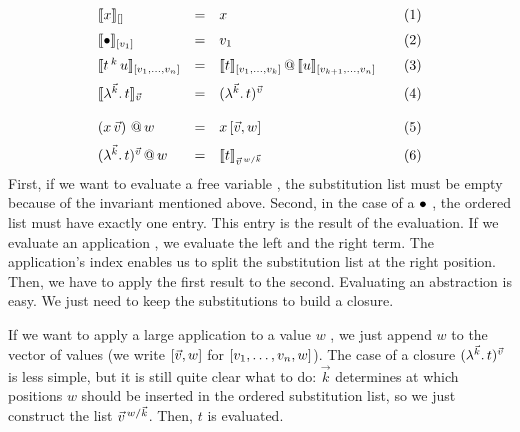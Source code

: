 \documentclass[submission,copyright,creativecommons]{eptcs}
\begin{document}
\[ 
\begin{array}{lcl@{\qquad} r}
 \ev x {\emptyVec} & = & x & \lab 1 \\ \noalign{\medskip}
 \ev \ovar {\ve{v_1}} & = & v_1 & \lab 2\\  \noalign{\medskip}
 \ev {t \oapp k u} {\ve{v_1, \ldots, v_n}} & = & {\ev t {\ve{v_1, \ldots, v_k}}} \ap {\ev u {\ve{v_{k+1}, \ldots, v_n}}}  & \lab 3 \\  \noalign{\medskip}
 \ev {\LaO {\vec k} t}  {\vec v} & = & \Val {\vec k} t {\vec v} & \lab 4 \\  
\\ 
 \pa{x \sspace \vec v} \ap w & = & x \sspace \ve{\vec v, w}  & \lab 5
\\ \noalign{\medskip}
 \Val{\vec k} t {\vec v}   \ap w & = & \ev t {\multiinsert{\vec v}{\vec k}{w}} & \lab 6
\end{array}
\]
First, if we want to evaluate a free variable , the substitution list must be empty because of the invariant mentioned above. 
Second, in the case of a $\ovar$ , the ordered list must have exactly one entry. This entry is the result of the evaluation. 
If we evaluate an application , we evaluate the left and the right term. The application's index enables us to split the substitution list at the right position. Then, we have to apply the first result to the second. 
Evaluating an abstraction  is easy. We just need to keep the substitutions to build a closure. 

If we want to apply a large application to a value $w$  , we just append $w$ to the vector of values (we write $\ve{\vec v, w}$ for $\ve{v_1, \ldots, v_n, w}$). 
The case of a closure $\Val {\vec k} t {\vec v}$  is less simple, but it is still quite clear what to do: $\vec k$ determines at which positions $w$ should be inserted in the ordered substitution list, so we just construct the list $\multiinsert {\vec v} {\vec k} w$. Then, $t$ is evaluated.
\end{document}
